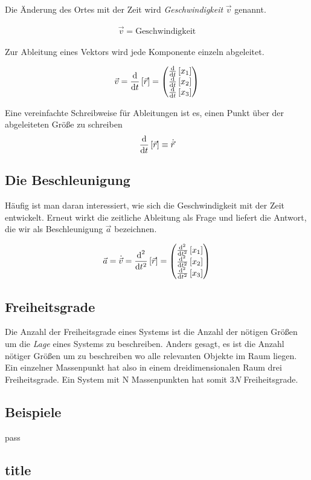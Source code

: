 Die Änderung des Ortes mit der Zeit wird \textit{Geschwindigkeit} $\vec{v}$ genannt.

\begin{align}
	\vec{v} = \text{Geschwindigkeit}
\end{align}

Zur Ableitung eines Vektors wird jede Komponente einzeln abgeleitet.

\begin{align}
	\vec{v}=\frac{\text{d}}{\text{d}t}\left[\vec{r}\right] = \begin{pmatrix} \frac{\text{d}}{\text{d}t}\left[x_1\right]\\\frac{\text{d}}{\text{d}t}\left[x_2\right]\\\frac{\text{d}}{\text{d}t}\left[x_3\right] \end{pmatrix}
\end{align}

Eine vereinfachte Schreibweise für Ableitungen ist es,  einen Punkt über der abgeleiteten Größe zu schreiben
\begin{align}
	\frac{\text{d}}{\text{d}t}\left[\vec{r}\right] \equiv \dot{\vec{r}}
\end{align}

\subsection{Die Beschleunigung}
Häufig ist man daran interessiert, wie sich die Geschwindigkeit mit der Zeit entwickelt. Erneut wirkt die zeitliche Ableitung als Frage und liefert die Antwort, die wir als Beschleunigung $\vec{a}$ bezeichnen.

\begin{align}
	\vec{a}=\dot{\vec{v}}=\frac{\text{d}^2}{\text{d}t^2}\left[\vec{r}\right] = \begin{pmatrix} \frac{\text{d}^2}{\text{d}t^2}\left[x_1\right]\\\frac{\text{d}^2}{\text{d}t^2}\left[x_2\right]\\\frac{\text{d}^2}{\text{d}t^2}\left[x_3\right] \end{pmatrix}
\end{align}

\subsection{Freiheitsgrade}
Die Anzahl der Freiheitsgrade eines Systems ist die Anzahl der nötigen Größen um die \textit{Lage} eines Systems zu beschreiben. Anders gesagt, es ist die Anzahl nötiger Größen um zu beschreiben wo alle relevanten Objekte im Raum liegen. Ein einzelner Massenpunkt hat also in einem dreidimensionalen Raum drei Freiheitsgrade. Ein System mit N Massenpunkten hat somit $3N$ Freiheitsgrade.

\subsection{Beispiele}
pass





\subsection{title} 
